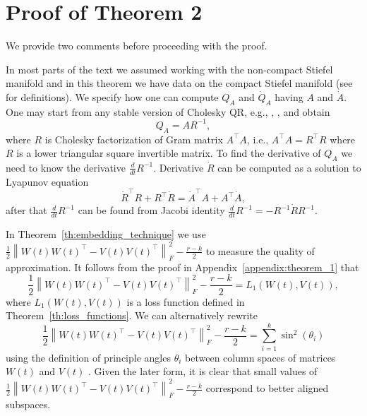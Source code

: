 \documentclass{article}
\begin{document}
\section{Proof of Theorem 2}
\label{appendix:theorem_2}
We provide two comments before proceeding with the proof.

In most parts of the text we assumed working with the non-compact Stiefel manifold and in this theorem we have data on the compact Stiefel manifold (see \cite{amsallem2010interpolation} for definitions). We specify how one can compute $Q_{A}$ and $\dot{Q}_{A}$ having $A$ and $\dot{A}$. One may start from any stable version of Cholesky QR, e.g., \cite{garrison2024randomized}, \cite{yamamoto2015roundoff}, and obtain
\begin{equation}
	Q_{A} = A R^{-1},
\end{equation}
where $R$ is Cholesky factorization of Gram matrix $A^\top A$, i.e., $A^\top A = R^\top R$ where $R$ is a lower triangular square invertible matrix. To find the derivative of $Q_{A}$ we need to know the derivative $\frac{d}{dt} R^{-1}$. Derivative $\dot{R}$ can be computed as a solution to Lyapunov equation
\begin{equation}
	\dot{R}^\top R + R^\top \dot{R} = \dot{A}^\top A + A^\top \dot{A},
\end{equation}
after that $\frac{d}{dt} R^{-1}$ can be found from Jacobi identity $\frac{d}{dt} R^{-1} = - R^{-1} \dot{R} R^{-1}.$

In Theorem~\ref{th:embedding_technique} we use $\frac{1}{2}\left\|W(t) W(t)^{\top} - V(t) V(t)^{\top}\right\|_{F}^2 - \frac{r-k}{2}$ to measure the quality of approximation. It follows from the proof in Appendix~\ref{appendix:theorem_1} that
\begin{equation}
	\frac{1}{2}\left\|W(t) W(t)^{\top} - V(t) V(t)^{\top}\right\|_{F}^2 - \frac{r-k}{2} = L_1(W(t), V(t)),
\end{equation}
where $L_1(W(t), V(t))$ is a loss function defined in Theorem~\ref{th:loss_functions}. We can alternatively rewrite
\begin{equation}
	\frac{1}{2}\left\|W(t) W(t)^{\top} - V(t) V(t)^{\top}\right\|_{F}^2 - \frac{r-k}{2} = \sum_{i=1}^{k}\sin^2(\theta_i)
\end{equation}
using the definition of principle angles $\theta_i$ between column spaces of matrices $W(t)$ and $V(t)$ \cite{bjorck1973numerical}. Given the later form, it is clear that small values of $\frac{1}{2}\left\|W(t) W(t)^{\top} - V(t) V(t)^{\top}\right\|_{F}^2 - \frac{r-k}{2}$ correspond to better aligned subspaces.
\end{document}
